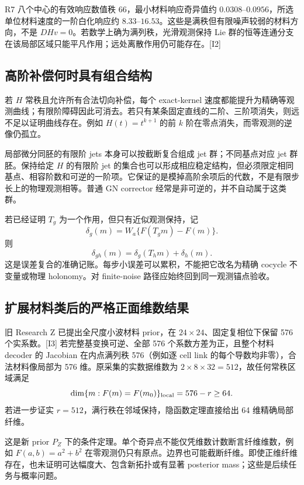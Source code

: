 R7 八个中心的有效响应数值秩 66，最小材料响应奇异值约 $0.0308$--$0.0956$，所选单位材料速度的一阶白化响应约 $8.33$--$16.53$。这些是满秩但有限噪声较弱的材料方向，不是 $DHv=0$。若数学上确为满列秩，光滑观测保持 Lie 群的恒等连通分支在该局部区域只能平凡作用；远处离散作用仍可能存在。[I2]

\subsection{高阶补偿何时具有组合结构}

若 $H$ 常秩且允许所有合法切向补偿，每个 exact-kernel 速度都能提升为精确等观测曲线；有限阶障碍因此可消去。若只有某条固定直线的二阶、三阶项消失，则远不足以证明曲线存在。例如 $H(t)=t^{k+1}$ 的前 $k$ 阶在零点消失，而零观测的逆像仍孤立。

局部微分同胚的有限阶 jets 本身可以按截断复合组成 jet 群；不同基点对应 jet 群胚。保持给定 $H$ 的有限阶 jet 的集合也可以形成相应稳定结构，但必须限定相同基点、相容阶数和可逆的一阶项。它保证的是模掉高阶余项后的代数，不是有限步长上的物理观测相等。普通 GN corrector 经常是非可逆的，并不自动属于这类群。

若已经证明 $T_g$ 为一个作用，但只有近似观测保持，记
\begin{equation}
\delta_g(m)=W_a\{F(T_gm)-F(m)\}.
\end{equation}
则
\begin{equation}
\delta_{gh}(m)=\delta_g(T_hm)+\delta_h(m).
\end{equation}
这是误差复合的准确记账。每步小误差可以累积，不能把它改名为精确 cocycle 不变量或物理 holonomy。对 finite-noise 路径应始终回到同一观测锚点验收。

\subsection{扩展材料类后的严格正面维数结果}

旧 Research Z 已提出全尺度小波材料 prior，在 $24\times24$、固定复相位下保留 576 个实系数。[I3] 若完整基变换可逆、全部 576 个系数方差为正，且整个材料 decoder 的 Jacobian 在内点满列秩 576（例如逐 cell link 的每个导数均非零），合法材料像局部为 576 维。原采集的实数据维数为 $2\times8\times32=512$，故任何常秩区域满足
\begin{equation}
\dim\{m:F(m)=F(m_0)\}_{\rm local}=576-r\ge64.
\end{equation}
若进一步证实 $r=512$，满行秩在邻域保持，隐函数定理直接给出 64 维精确局部纤维。

这是新 prior $P_Z$ 下的条件定理。单个奇异点不能仅凭维数计数断言纤维维数，例如 $F(a,b)=a^2+b^2$ 在零观测仍只有原点。边界也可能截断纤维。即使正维纤维存在，也未证明可达幅度大、包含新拓扑或有显著 posterior mass；这些是后续任务与概率问题。


